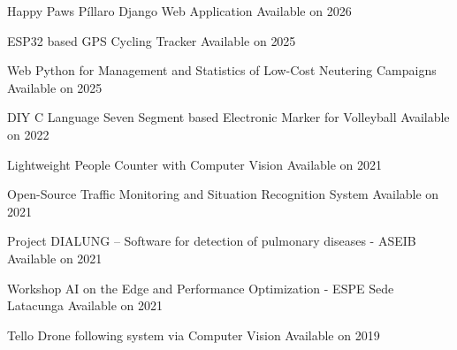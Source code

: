 

\begin{cvhonors}

  \cvhonor
    {Happy Paws Píllaro Django Web Application} %
    {Available on } %
    {} %
    {2026} %

  \cvhonor
    {ESP32 based GPS Cycling Tracker} %
    {Available on } %
    {} %
    {2025} %

  \cvhonor
    {Web Python for Management and Statistics of Low-Cost Neutering Campaigns} %
    {Available on } %
    {} %
    {2025} %

  \cvhonor
    {DIY C Language Seven Segment based Electronic Marker for Volleyball} %
    {Available on } %
    {} %
    {2022} %

  \cvhonor
    {Lightweight People Counter with Computer Vision} %
    {Available on } %
    {} %
    {2021} %

  \cvhonor
    {Open-Source Traffic Monitoring and Situation Recognition System} %
    {Available on } %
    {} %
    {2021} %

  \cvhonor
    {Project DIALUNG – Software for detection of pulmonary diseases - ASEIB} %
    {Available on } %
    {} %
    {2021} %
  
  \cvhonor
    {Workshop AI on the Edge and Performance Optimization - ESPE Sede Latacunga} %
    {Available on } %
    {} %
    {2021} %

  \cvhonor
    {Tello Drone following system via Computer Vision} %
    {Available on } %
    {} %
    {2019} %

\end{cvhonors}
